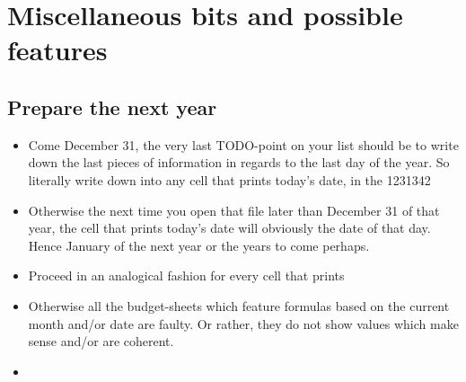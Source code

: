 \section{Miscellaneous bits and possible features}
\label{section:Miscellaneous_bits_and_possible_features}

\subsection{Prepare the next year}
\label{sec:PreparationNextYear}

\begin{itemize}
	\item Come December 31, the very last TODO-point on your list should be to write down the last pieces of information in regards to the last day of the year.
	So literally write down  into any cell that prints today's date, \eg in the 1231342%
	\item Otherwise the next time you open that file later than December 31 of that year, the cell that prints today's date will obviously the date of that day.
	Hence January of the next year or the years to come perhaps.
	\item Proceed in an analogical fashion for every cell that prints 
	\item Otherwise all the budget-sheets which feature formulas based on the current month and/or date are faulty. Or rather, they do not show values which make sense and/or are coherent.
	\item 
\end{itemize}

